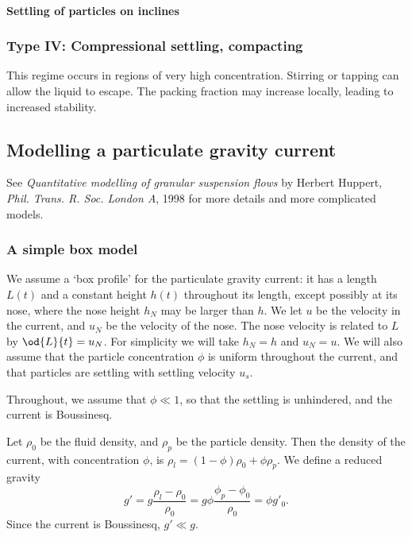 \paragraph{Settling of particles on inclines}

\subsubsection{Type IV: Compressional settling, compacting}

This regime occurs in regions of very high concentration. Stirring or tapping can allow the liquid to escape. The packing fraction may increase locally, leading to increased stability.  

\subsection{Modelling a particulate gravity current}


See \textit{Quantitative modelling of granular suspension flows} by Herbert Huppert, \textit{Phil. Trans. R. Soc. London A}, 1998 for more details and more complicated models. 

\subsubsection{A simple box model}
We assume a `box profile' for the particulate gravity current: it has a length $L(t)$ and a constant height $h(t)$ throughout its length, except possibly at its nose, where the nose height $h_N$ may be larger than $h$. We let $u$ be the velocity in the current, and $u_N$ be the velocity of the nose. The nose velocity is related to $L$ by $\od{L}{t} = u_N$. For simplicity we will take $h_N = h$ and $u_N = u$. We will also assume that the particle concentration $\phi$ is uniform throughout the current, and that particles are settling with settling velocity $u_s$.  

Throughout, we assume that $\phi\ll1$, so that the settling is unhindered, and the current is Boussinesq. 

Let $\rho_0$ be the fluid density, and $\rho_p$ be the particle density. Then the density of the current, with concentration $\phi$, is $\rho_l = (1-\phi)\rho_0 + \phi \rho_p$. We define a reduced gravity
\begin{equation}
g' = g \frac{\rho_l - \rho_0}{\rho_0} = g\phi\frac{\phi_p - \phi_0}{\rho_0} = \phi g'_0.
\end{equation} 
Since the current is Boussinesq, $g' \ll g$. 

